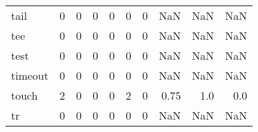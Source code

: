 \begin{longtable}{lrrrrrrrrr}
tail      &                                       0 &                                                  0 &                                                  0 &                                                  0 &                                                  0 &                                                  0 &                                                NaN &                                    NaN &                                  NaN \\
tee       &                                       0 &                                                  0 &                                                  0 &                                                  0 &                                                  0 &                                                  0 &                                                NaN &                                    NaN &                                  NaN \\
test      &                                       0 &                                                  0 &                                                  0 &                                                  0 &                                                  0 &                                                  0 &                                                NaN &                                    NaN &                                  NaN \\
timeout   &                                       0 &                                                  0 &                                                  0 &                                                  0 &                                                  0 &                                                  0 &                                                NaN &                                    NaN &                                  NaN \\
touch     &                                       2 &                                                  0 &                                                  0 &                                                  0 &                                                  2 &                                                  0 &                                               0.75 &                                    1.0 &                                  0.0 \\
tr        &                                       0 &                                                  0 &                                                  0 &                                                  0 &                                                  0 &                                                  0 &                                                NaN &                                    NaN &                                  NaN \\

\end{longtable}
